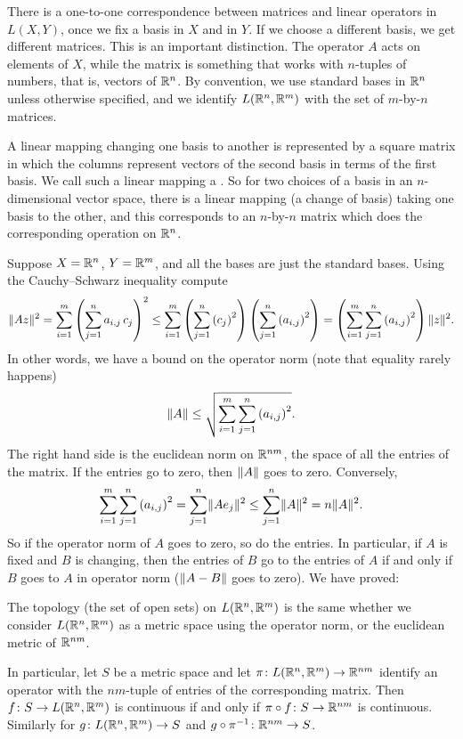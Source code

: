 There is a one-to-one correspondence between matrices and linear operators in
$L(X,Y)$, once we fix a basis in $X$ and in $Y$.  If we 
choose a different basis, we get different matrices.
This is an important distinction.
The operator $A$ acts on elements of $X$, while the matrix
is something that works with $n$-tuples of numbers, that is, vectors of
${\mathbb{R}}^n$.  By convention, we use standard bases in ${\mathbb{R}}^n$ unless otherwise
specified, and we identify $L({\mathbb{R}}^n,{\mathbb{R}}^m)$ with the set of $m$-by-$n$ matrices.

A linear mapping changing one basis to another is represented by a
square matrix in which the columns represent vectors
of the second basis in terms of the first basis.  We call such a linear
mapping a \emph{}.  So for two choices of a
basis in an $n$-dimensional vector space, there is a linear mapping
(a change of basis)
taking one basis to the other, and this corresponds to an $n$-by-$n$
matrix which does the corresponding operation on ${\mathbb{R}}^n$.

\medskip

Suppose
$X={\mathbb{R}}^n$, $Y={\mathbb{R}}^m$, and
all the bases are just the standard bases.
Using the Cauchy--Schwarz inequality compute
\begin{equation*}
\lVert {Az} \rVert^2
=
\sum_{i=1}^m { \left(\sum_{j=1}^n a_{i,j} \, c_j \right)}^2
\leq
\sum_{i=1}^m { \left(\sum_{j=1}^n {(c_j)}^2 \right) \left(\sum_{j=1}^n
{(a_{i,j})}^2 \right) }
=
\left(
\sum_{i=1}^m \sum_{j=1}^n {(a_{i,j})}^2 \right)
\lVert {z} \rVert^2 .
\end{equation*}
In other words, we have a bound on the operator norm (note that equality
rarely happens)
\begin{equation*}
\lVert {A} \rVert \leq
\sqrt{\sum_{i=1}^m \sum_{j=1}^n {(a_{i,j})}^2} .
\end{equation*}
The right hand side is the euclidean norm on ${\mathbb{R}}^{nm}$, the space
of all the entries of the matrix.
If the entries go to zero, then $\lVert {A} \rVert$ goes to zero.
Conversely,
\begin{equation*}
\sum_{i=1}^m \sum_{j=1}^n {(a_{i,j})}^2
=
\sum_{j=1}^n \lVert {A e_j} \rVert^2
\leq
\sum_{j=1}^n \lVert {A} \rVert^2
= n \lVert {A} \rVert^2 .
\end{equation*}
So if the operator norm of $A$ goes to zero, so do the entries.
In particular, if $A$ is fixed and $B$ is changing,
then the entries of $B$ go to the entries of $A$ if and only if $B$ goes to $A$ in
operator norm ($\lVert {A-B} \rVert$ goes to zero).  We have proved:

\begin{prop} \label{prop:matrixcont}
The topology (the set of open sets) on $L({\mathbb{R}}^n,{\mathbb{R}}^m)$ is the same
whether we consider $L({\mathbb{R}}^n,{\mathbb{R}}^m)$ as a metric space using the operator
norm, or the euclidean metric of ${\mathbb{R}}^{nm}$.

In particular, let $S$ be a metric space and let
$\pi \colon L({\mathbb{R}}^n,{\mathbb{R}}^m) \to {\mathbb{R}}^{nm}$ identify
an operator with the $nm$-tuple of entries of the corresponding matrix.
Then
$f \colon S \to L({\mathbb{R}}^n,{\mathbb{R}}^m)$
is continuous
if and only if
$\pi \circ f \colon S \to {\mathbb{R}}^{nm}$ is
continuous.
Similarly for
$g \colon L({\mathbb{R}}^n,{\mathbb{R}}^m) \to S$ and
$g \circ \pi^{-1} \colon {\mathbb{R}}^{nm} \to S$.
\end{prop}

